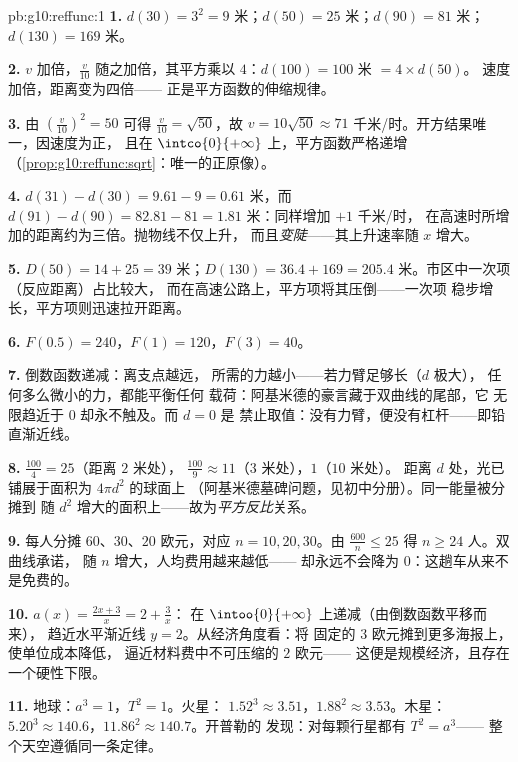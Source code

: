 \begin{solution}{pb:g10:reffunc:1}
\textbf{1.} $d(30) = 3^2 = 9$ 米；$d(50) = 25$ 米；$d(90) =
81$ 米；$d(130) = 169$ 米。

\textbf{2.} $v$ 加倍，$\frac v{10}$ 随之加倍，其平方乘以
$4$：$d(100) = 100$ 米 $= 4 \times d(50)$。
速度加倍，距离变为四倍——
正是平方函数的伸缩规律。

\textbf{3.} 由 $\left(\frac{v}{10}\right)^2 = 50$ 可得
$\frac{v}{10} = \sqrt{50}$，故 $v = 10\sqrt{50} \approx 71$
千米/时。开方结果唯一，因速度为正，
且在
$\intco{0}{+\infty}$ 上，平方函数严格递增
（\cref{prop:g10:reffunc:sqrt}：唯一的正原像）。

\textbf{4.} $d(31) - d(30) = 9.61 - 9 = 0.61$ 米，而
$d(91) - d(90) = 82.81 - 81 = 1.81$ 米：同样增加 $+1$ 千米/时，
在高速时所增加的距离约为三倍。抛物线不仅上升，
而且\emph{变陡}——其上升速率随 $x$ 增大。

\textbf{5.} $D(50) = 14 + 25 = 39$ 米；$D(130) = 36.4 + 169 =
205.4$ 米。市区中一次项（反应距离）占比较大，
而在高速公路上，平方项将其压倒——一次项
稳步增长，平方项则迅速拉开距离。

\textbf{6.} $F(0.5) = 240$，$F(1) = 120$，$F(3) = 40$。

\textbf{7.} 倒数函数递减：离支点越远，
所需的力越小——若力臂足够长（$d$ 极大），
任何多么微小的力，都能平衡任何
载荷：阿基米德的豪言藏于双曲线的尾部，它
无限趋近于 $0$ 却永不触及。而 $d = 0$ 是
禁止取值：没有力臂，便没有杠杆——即铅直渐近线。

\textbf{8.} $\frac{100}{4} = 25$（距离 $2$ 米处），
$\frac{100}{9} \approx 11$（$3$ 米处），$1$（$10$ 米处）。
距离 $d$ 处，光已铺展于面积为 $4\pi d^2$ 的球面上
（阿基米德墓碑问题，见初中分册）。同一能量被分摊到
随 $d^2$ 增大的面积上——故为\emph{平方反比}关系。

\textbf{9.} 每人分摊 $60$、$30$、$20$ 欧元，对应 $n = 10, 20,
30$。由 $\frac{600}{n} \leq 25$ 得 $n \geq 24$ 人。双曲线承诺，
随 $n$ 增大，人均费用越来越低——
却永远不会降为 $0$：这趟车从来不是免费的。

\textbf{10.} $a(x) = \frac{2x + 3}{x} = 2 + \frac3x$：
在 $\intoo{0}{+\infty}$ 上递减（由倒数函数平移而来），
趋近水平渐近线 $y = 2$。从经济角度看：将
固定的 $3$ 欧元摊到更多海报上，使单位成本降低，
逼近材料费中不可压缩的 $2$ 欧元——
这便是规模经济，且存在一个硬性下限。

\textbf{11.} 地球：$a^3 = 1$，$T^2 = 1$。火星：
$1.52^3 \approx 3.51$，$1.88^2 \approx 3.53$。木星：
$5.20^3 \approx 140.6$，$11.86^2 \approx 140.7$。开普勒的
发现：对每颗行星都有 $T^2 = a^3$——
整个天空遵循同一条定律。


\end{solution}

